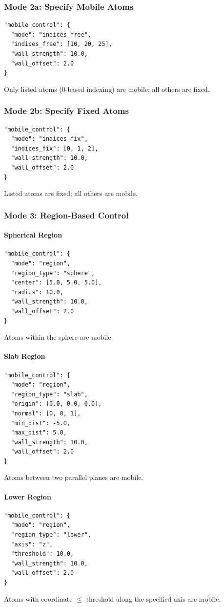 \documentclass[11pt,a4paper]{article}
\begin{document}
\subsubsection{Mode 2a: Specify Mobile Atoms}
\begin{lstlisting}[style=jsonStyle]
"mobile_control": {
  "mode": "indices_free",
  "indices_free": [10, 20, 25],
  "wall_strength": 10.0,
  "wall_offset": 2.0
}
\end{lstlisting}
Only listed atoms (0-based indexing) are mobile; all others are fixed.

\subsubsection{Mode 2b: Specify Fixed Atoms}
\begin{lstlisting}[style=jsonStyle]
"mobile_control": {
  "mode": "indices_fix",
  "indices_fix": [0, 1, 2],
  "wall_strength": 10.0,
  "wall_offset": 2.0
}
\end{lstlisting}
Listed atoms are fixed; all others are mobile.

\subsubsection{Mode 3: Region-Based Control}

\paragraph{Spherical Region}
\begin{lstlisting}[style=jsonStyle]
"mobile_control": {
  "mode": "region",
  "region_type": "sphere",
  "center": [5.0, 5.0, 5.0],
  "radius": 10.0,
  "wall_strength": 10.0,
  "wall_offset": 2.0
}
\end{lstlisting}
Atoms within the sphere are mobile.

\paragraph{Slab Region}
\begin{lstlisting}[style=jsonStyle]
"mobile_control": {
  "mode": "region",
  "region_type": "slab",
  "origin": [0.0, 0.0, 0.0],
  "normal": [0, 0, 1],
  "min_dist": -5.0,
  "max_dist": 5.0,
  "wall_strength": 10.0,
  "wall_offset": 2.0
}
\end{lstlisting}
Atoms between two parallel planes are mobile.

\paragraph{Lower Region}
\begin{lstlisting}[style=jsonStyle]
"mobile_control": {
  "mode": "region",
  "region_type": "lower",
  "axis": "z",
  "threshold": 10.0,
  "wall_strength": 10.0,
  "wall_offset": 2.0
}
\end{lstlisting}
Atoms with coordinate $\le$ threshold along the specified axis are mobile.
\end{document}
